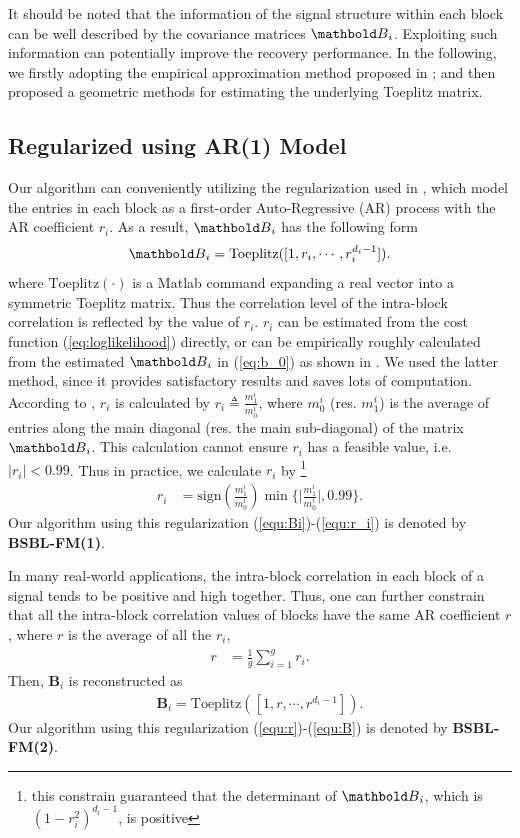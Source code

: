 It should be noted that the information of the signal structure within each block
can be well described by the covariance matrices $\ve{B}_i$.
Exploiting such information can potentially improve the recovery performance.
In the following, we firstly adopting the empirical approximation method 
proposed in \cite{Zhang2012a}; and then proposed a geometric methods for
estimating the underlying Toeplitz matrix.

\subsection{Regularized using AR(1) Model\cite{Zhang2012}}
Our algorithm can conveniently utilizing the regularization used in \cite{Zhang2012a},
which model the entries in each block as a first-order Auto-Regressive (AR) process with the AR coefficient $r_i$. As a result,
$\ve{B}_i$ has the following form
\begin{equation}
\ve{B}_i = \mathrm{Toeplitz}([1,r_i,\cdots,r_i^{d_i-1}]). \label{equ:Bi}
\end{equation}
where $\mathrm{Toeplitz}(\cdot)$ is a Matlab command expanding a real vector into a
symmetric Toeplitz matrix. Thus the correlation level of the intra-block correlation is reflected by the value of $r_i$. $r_i$ can be estimated from the cost function (\ref{eq:loglikelihood}) directly, or can be empirically roughly calculated from the estimated $\ve{B}_i$ in (\ref{eq:b_0}) as shown in \cite{Zhang2012a}. We used the latter method, since it provides satisfactory results and saves lots of computation. According to \cite{Zhang2012a}, $r_i$ is calculated by $r_i \triangleq\frac{m_1^i}{m_0^i}$,
where $m_0^i$ (res. $m_1^i$) is the average of entries along the main diagonal
(res. the main sub-diagonal) of the matrix $\ve{B}_i$. This calculation cannot ensure $r_i$ has a feasible value, i.e. $|r_i|<0.99$.
Thus in practice, we calculate $r_i$ by
\footnote{%
this constrain guaranteed that the determinant of $\ve{B}_i$, 
which is $(1-r_i^2)^{d_i-1}$, is positive} %
\begin{align}
r_i &= \mathrm{sign}(\frac{m^i_1}{m^i_0}) \min \Big\{\Big|\frac{m^i_1}{m^i_0}\Big|,0.99 \Big\}. \label{equ:r_i}
\end{align}
Our algorithm using this regularization (\ref{equ:Bi})-(\ref{equ:r_i}) is denoted by {\bf BSBL-FM(1)}.


In many real-world applications, the intra-block correlation in each block of a signal
tends to be positive and high together. Thus, one can further constrain that
all the intra-block
correlation values of blocks have the same AR coefficient $r$ \cite{Zhang2012a}, where $r$ is the average of all the $r_i$,
\begin{align}
r &= \frac{1}{g}\sum_{i=1}^g r_i.  \label{equ:r}
\end{align}
Then, $\mathbf{B}_i$ is reconstructed as
\begin{eqnarray}
\mathbf{B}_i = \mathrm{Toeplitz}([1,r,\cdots,r^{d_i-1}]). \label{equ:B}
\end{eqnarray}
Our algorithm using this regularization (\ref{equ:r})-(\ref{equ:B}) is denoted by {\bf BSBL-FM(2)}.

